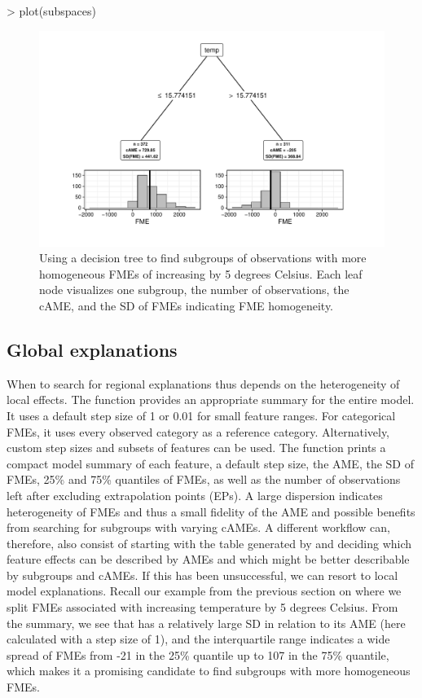\begin{example}
> plot(subspaces)
\end{example}
\begin{figure}[H]
    \centering
    \includegraphics[width = \textwidth]{figures/subspaces_plot.pdf}
    \caption{Using a decision tree to find subgroups of observations with more homogeneous FMEs of increasing  by 5 degrees Celsius. Each leaf node visualizes one subgroup, the number of observations, the cAME, and the SD of FMEs indicating FME homogeneity.}
\end{figure}


\subsection{Global explanations}

When to search for regional explanations thus depends on the heterogeneity of local effects. The  function provides an appropriate summary for the entire model.
It uses a default step size of 1 or 0.01 for small feature ranges. 
For categorical FMEs, it uses every observed category as a reference category. Alternatively, custom step sizes and subsets of features can be used.  
The  function prints a compact model summary of each feature, a default step size, the AME, the SD of FMEs, 25\% and 75\% quantiles of FMEs, as well as the number of observations left after excluding extrapolation points (EPs). A large dispersion indicates heterogeneity of FMEs and thus a small fidelity of the AME and possible benefits from searching for subgroups with varying cAMEs.
A different workflow can, therefore, also consist of starting with the table generated by  and deciding which feature effects can be described by AMEs and which might be better describable by subgroups and cAMEs. If this has been unsuccessful, we can resort to local model explanations. Recall our example from the previous section on  where we split FMEs associated with increasing temperature by 5 degrees Celsius. From the  summary, we see that  has a relatively large SD in relation to its AME (here calculated with a step size of 1), and the interquartile range indicates a wide spread of FMEs from -21 in the 25\% quantile up to 107 in the 75\% quantile, which makes it a promising candidate to find subgroups with more homogeneous FMEs.

